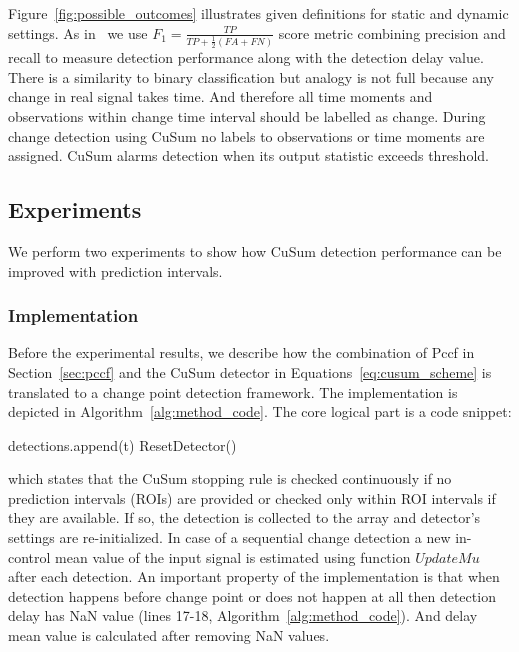 Figure~\ref{fig:possible_outcomes} illustrates given definitions for static and dynamic settings. As in~\cite{plasse2021streaming} we use $F_1=\frac{TP}{TP+\frac{1}{2}(FA+FN)}$ score metric combining precision and recall to measure detection performance along with the detection delay value.
There is a similarity to binary classification but analogy is not full because any change in real signal takes time.
And therefore all time moments and observations within change time interval should be labelled as change.
During change detection using CuSum no labels to observations or time moments are assigned.
CuSum alarms detection when its output statistic exceeds threshold.


\subsection{Experiments}\label{sec:experiments}
We perform two experiments to show how CuSum detection performance can be improved with prediction intervals. 

\subsubsection{Implementation}\label{sec:implementation}
Before the experimental results, we describe how the combination of Pccf in Section~\ref{sec:pccf} and the CuSum detector in Equations~\ref{eq:cusum_scheme} is translated to a change point detection framework.
The implementation is depicted in Algorithm~\ref{alg:method_code}.
The core logical part is a code snippet:
\begin{algorithm}[!h]
	\begin{algorithmic}
            \State detections.append(t)
            \State ResetDetector()
        \EndIf
    \EndIf
	\end{algorithmic}
\end{algorithm}

\noindent
which states that the CuSum stopping rule is checked continuously if no prediction intervals (ROIs) are provided or checked only within ROI intervals if they are available. If so, the detection is collected to the array  and detector's settings are re-initialized. In case of a sequential change detection a new in-control mean value of the input signal is estimated using function $UpdateMu$ after each detection. An important property of the implementation is that  when detection happens before change point or does not happen at all then detection delay has NaN value (lines 17-18, Algorithm~\ref{alg:method_code}). And delay mean value is calculated after removing NaN values.


